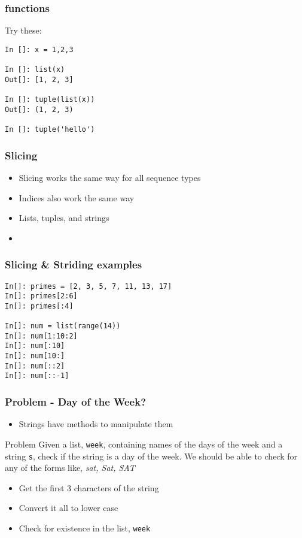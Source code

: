 \documentclass[14pt,compress]{beamer}
\begin{document}
\begin{frame}[fragile]
  \frametitle{ functions}
  Try these:
\begin{lstlisting}
In []: x = 1,2,3

In []: list(x)
Out[]: [1, 2, 3]

In []: tuple(list(x))
Out[]: (1, 2, 3)

In []: tuple('hello')
\end{lstlisting}
\end{frame}

\begin{frame}
  \frametitle{Slicing}
  \begin{itemize}
  \item Slicing works the same way for all sequence types
  \item Indices also work the same way
  \item Lists, tuples, and strings
  \item \alert{}
  \end{itemize}
\end{frame}

\begin{frame}[fragile]
  \frametitle{Slicing \& Striding examples}
  \begin{lstlisting}
In[]: primes = [2, 3, 5, 7, 11, 13, 17]
In[]: primes[2:6]
In[]: primes[:4]

In[]: num = list(range(14))
In[]: num[1:10:2]
In[]: num[:10]
In[]: num[10:]
In[]: num[::2]
In[]: num[::-1]
  \end{lstlisting}
\end{frame}

\begin{frame}
  \frametitle{Problem - Day of the Week?}
  \begin{itemize}
  \item Strings have methods to manipulate them
  \end{itemize}
  \begin{block}{Problem}
    Given a list, \texttt{week}, containing names of the days of the
    week and a string \texttt{s}, check if the string is a day of the
    week. We should be able to check for any of the forms like,
    \emph{sat, Sat, SAT}
  \end{block}
  \begin{itemize}
  \item Get the first 3 characters of the string
  \item Convert it all to lower case
  \item Check for existence in the list, \texttt{week}
  \end{itemize}
\end{frame}
\end{document}
